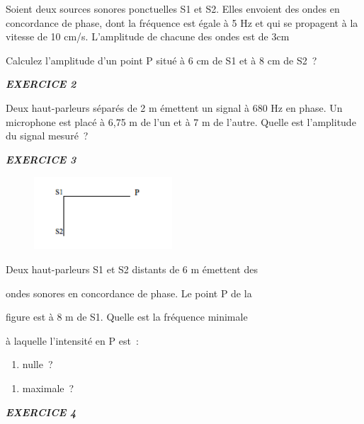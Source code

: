 {Soient deux sources sonores ponctuelles S1 et S2. Elles envoient des
ondes en concordance de phase, dont la fréquence est égale à 5 Hz et qui
se propagent à la vitesse de 10 cm/s. L'amplitude de chacune des ondes
est de 3cm

Calculez l'amplitude d'un point P situé à 6 cm de S1 et à 8 cm de S2~?

\emph{\textbf{EXERCICE 2}}

Deux haut-parleurs séparés de 2 m émettent un signal à 680 Hz en phase.
Un microphone est placé à 6,75 m de l'un et à 7 m de l'autre. Quelle est
l'amplitude du signal mesuré~?

\emph{\textbf{EXERCICE 3}}

\begin{figure}
\centering
\includegraphics[width=5.151cm,height=2.729cm]{Pictures/10000001000000BC000000630AF71C86AA2A0A65.png}
\caption{}
\end{figure}

Deux haut-parleurs S1 et S2 distants de 6 m émettent des

ondes sonores en concordance de phase. Le point P de la

figure est à 8 m de S1. Quelle est la fréquence minimale

à laquelle l'intensité en P est~:

\begin{enumerate}
\def\labelenumi{\alph{enumi})}
\tightlist
\item
  nulle~?
\end{enumerate}

\begin{enumerate}
\def\labelenumi{\alph{enumi})}
\tightlist
\item
  maximale~?
\end{enumerate}

\emph{\textbf{EXERCICE 4}}

}
